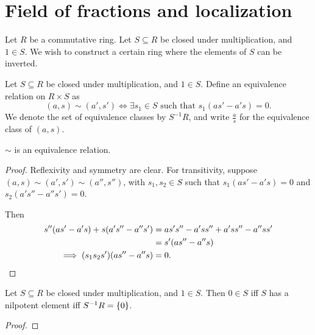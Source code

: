 \section{Field of fractions and localization} \label{sec:local}

Let $R$ be a commutative ring.
Let $S \subseteq R$ be closed under multiplication, and $1 \in S$.
We wish to construct a certain ring where the elements of $S$ can be
inverted.

\begin{definition}
    Let $S \subseteq R$ be closed under multiplication, and $1 \in S$.
    Define an equivalence relation on $R \times S$ as \[
        (a, s) \sim (a', s') \iff \exists s_1 \in S \text{ such that }
            s_1(as' - a's) = 0.
    \]
    We denote the set of equivalence classes by $S^{-1}R$, and write
    $\frac as$ for the equivalence class of $(a, s)$.
\end{definition}
\begin{exercise}
    $\sim$ is an equivalence relation.
\end{exercise}
\begin{proof}
    Reflexivity and symmetry are clear.
    For transitivity, suppose $(a, s) \sim (a', s') \sim (a'', s'')$,
    with $s_1, s_2 \in S$ such that $s_1(as' - a's) = 0$ and
    $s_2(a's'' - a''s') = 0$.

    Then \begin{align*}
        s''(as' - a's) + s(a's'' - a''s')
            &= as's'' - a'ss'' + a'ss'' - a''ss' \\
            &= s'(as'' - a''s) \\
        \implies (s_1s_2s') (as'' - a''s) &= 0. \qedhere
    \end{align*}
\end{proof}

\begin{exercise}
    Let $S \subseteq R$ be closed under multiplication, and $1 \in S$.
    Then $0 \in S$ iff $S$ has a nilpotent element iff $S^{-1}R = \{0\}$.
\end{exercise}
\begin{proof}
    
\end{proof}

